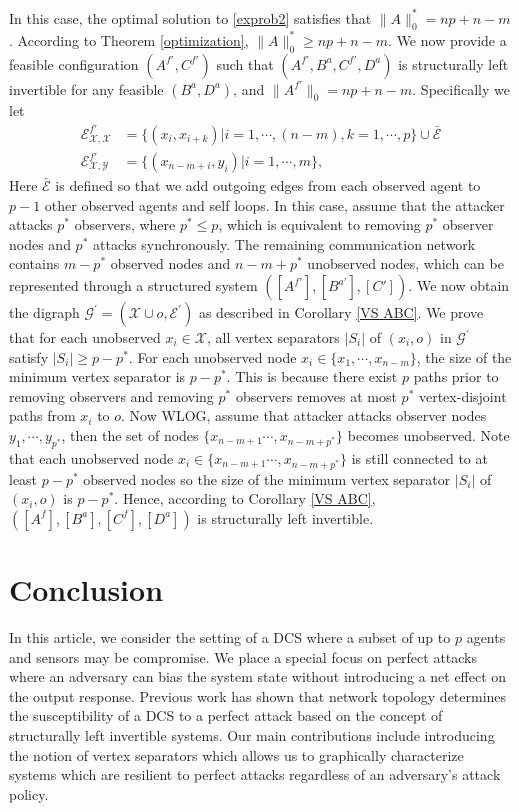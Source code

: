 \documentclass[letterpaper, 10 pt, conference]{ieeeconf}
\begin{document}
In this case, the optimal solution to \eqref{exprob2} satisfies that $\|A\|_0^* = np + n -m$. According to Theorem \ref{optimization}, $\|A\|_0^* \geq np + n -m$. We now provide a feasible configuration $(A^{f'},C^{f'})$ such that $(A^{f'},B^a,C^{f'},D^a)$ is structurally left invertible for any feasible $(B^a,D^a)$, and $\|A^{f'}\|_0= np + n - m$. Specifically we let
\begin{align*}
 \mathcal E^{f'}_{\mathcal X,\mathcal X} &=\{(x_i,x_{i+k})|i=1,\cdots,(n-m),k=1,\cdots,p\}\cup \bar{\mathcal E} \\
 \mathcal E^{f'}_{\mathcal X,\mathcal Y} &=\{(x_{n-m+i},y_i)|i=1,\cdots,m\},
 \end{align*}
Here $\bar{\mathcal E}$ is defined so that we add outgoing edges from each observed agent to $p-1$ other observed agents and self loops. In this case, assume that the attacker attacks $p^*$ observers, where $p^*\leq p$, which is equivalent to removing $p^*$ observer nodes and $p^*$ attacks synchronously. The remaining communication network contains $m-p^*$ observed nodes and $n-m+p^*$ unobserved nodes, which can be represented through a structured system $([A^{f'}],[B^{a'}],[C'])$. We now obtain the digraph $\mathcal{G}^\prime = (\mathcal{X} \cup o, \mathcal{E}^\prime)$ as described in Corollary \ref{VS ABC}. We prove that for each unobserved $x_i \in \mathcal{X}$, all vertex separators $|S_i|$ of $(x_i,o)$ in $\mathcal{G}^\prime$ satisfy $|S_i| \ge p-p^*$. For each unobserved node $x_i\in\{x_1,\cdots,x_{n-m}\}$, the size of the minimum vertex separator is $p-p^*$. This is because there exist $p$ paths prior to removing observers and removing $p^*$ observers removes at most $p^*$ vertex-disjoint paths from $x_{i}$ to $o$. Now WLOG, assume that attacker attacks observer nodes $y_{1},\cdots,y_{p^*}$, then the set of nodes $\{x_{n-m+1}\cdots,x_{n-m+p^*}\}$ becomes unobserved. Note that each unobserved node $x_i\in\{x_{n-m+1}\cdots,x_{n-m+p^*}\}$ is still connected to at least $p-p^*$ observed nodes so the size of the minimum vertex separator $|S_i|$ of $(x_i,o)$ is $p-p^*$. Hence, according to Corollary \ref{VS ABC}, $([A^f],[B^a],[C^f],[D^a])$ is structurally left invertible.


 

\section{Conclusion}
In this article, we consider the setting of a DCS where a subset of up to $p$ agents and sensors may be compromise. We place a special focus on perfect attacks where an adversary can bias the system state without introducing a net effect on the output response. Previous work has shown that network topology determines the susceptibility of a DCS to a perfect attack based on the concept of structurally left invertible systems. Our main contributions include introducing the notion of vertex separators which allows us to graphically characterize systems which are resilient to perfect attacks regardless of an adversary's attack policy. 
\end{document}

